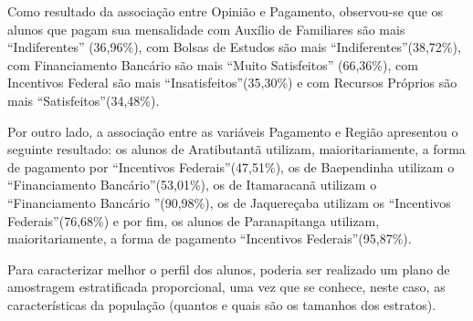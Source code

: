 Como resultado da associação entre Opinião e Pagamento, observou-se que os alunos que pagam sua mensalidade com Auxílio de Familiares são mais \textquotedblleft Indiferentes\textquotedblright 
(36,96\%), com Bolsas de Estudos são mais \textquotedblleft Indiferentes\textquotedblright (38,72\%), com Financiamento Bancário são mais \textquotedblleft Muito Satisfeitos\textquotedblright 
(66,36\%), com Incentivos Federal são mais \textquotedblleft Insatisfeitos\textquotedblright (35,30\%) e com Recursos Próprios são mais \textquotedblleft Satisfeitos\textquotedblright (34,48\%).

Por outro lado, a associação entre as variáveis Pagamento e Região apresentou o seguinte resultado: os alunos de Aratibutantã utilizam, maioritariamente, a forma de pagamento por 
\textquotedblleft Incentivos Federais\textquotedblright (47,51\%), os de Baependinha utilizam o \textquotedblleft Financiamento Bancário\textquotedblright (53,01\%), os de Itamaracanã utilizam o 
\textquotedblleft Financiamento Bancário \textquotedblright (90,98\%), os de Jaquereçaba utilizam os \textquotedblleft Incentivos Federais\textquotedblright (76,68\%) e por fim, os alunos de 
Paranapitanga utilizam, maioritariamente, a forma de pagamento \textquotedblleft Incentivos Federais\textquotedblright (95,87\%). 


Para caracterizar melhor o perfil dos alunos, poderia ser realizado um plano de amostragem estratificada proporcional, uma vez que se conhece, neste caso, as características da população (quantos e 
quais são os tamanhos dos estratos). 